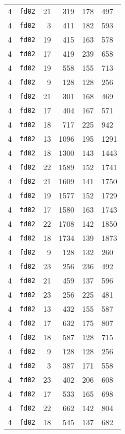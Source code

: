 \documentclass{article}
\begin{document}
\begin{table}[h!]
\begin{tabular}{llrrrl}
    4 & \texttt{fd02} & 21 & 319 & 178 & 497 \\
    4 & \texttt{fd02} & 3 & 411 & 182 & 593 \\
    4 & \texttt{fd02} & 19 & 415 & 163 & 578 \\
    4 & \texttt{fd02} & 17 & 419 & 239 & 658 \\
    4 & \texttt{fd02} & 19 & 558 & 155 & 713 \\
    4 & \texttt{fd02} & 9 & 128 & 128 & 256 \\
    4 & \texttt{fd02} & 21 & 301 & 168 & 469 \\
    4 & \texttt{fd02} & 17 & 404 & 167 & 571 \\
    4 & \texttt{fd02} & 18 & 717 & 225 & 942 \\
    4 & \texttt{fd02} & 13 & 1096 & 195 & 1291 \\
    4 & \texttt{fd02} & 18 & 1300 & 143 & 1443 \\
    4 & \texttt{fd02} & 22 & 1589 & 152 & 1741 \\
    4 & \texttt{fd02} & 21 & 1609 & 141 & 1750 \\
    4 & \texttt{fd02} & 19 & 1577 & 152 & 1729 \\
    4 & \texttt{fd02} & 17 & 1580 & 163 & 1743 \\
    4 & \texttt{fd02} & 22 & 1708 & 142 & 1850 \\
    4 & \texttt{fd02} & 18 & 1734 & 139 & 1873 \\
    4 & \texttt{fd02} & 9 & 128 & 132 & 260 \\
    4 & \texttt{fd02} & 23 & 256 & 236 & 492 \\
    4 & \texttt{fd02} & 21 & 459 & 137 & 596 \\
    4 & \texttt{fd02} & 23 & 256 & 225 & 481 \\
    4 & \texttt{fd02} & 13 & 432 & 155 & 587 \\
    4 & \texttt{fd02} & 17 & 632 & 175 & 807 \\
    4 & \texttt{fd02} & 18 & 587 & 128 & 715 \\
    4 & \texttt{fd02} & 9 & 128 & 128 & 256 \\
    4 & \texttt{fd02} & 3 & 387 & 171 & 558 \\
    4 & \texttt{fd02} & 23 & 402 & 206 & 608 \\
    4 & \texttt{fd02} & 17 & 533 & 165 & 698 \\
    4 & \texttt{fd02} & 22 & 662 & 142 & 804 \\
    4 & \texttt{fd02} & 18 & 545 & 137 & 682 \\

\end{tabular}
\end{table}
\end{document}
